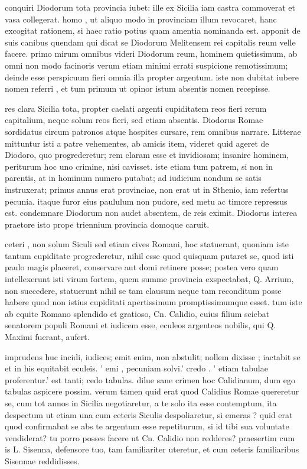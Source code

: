  conquiri Diodorum tota provincia iubet: ille ex Sicilia iam castra commoverat et vasa collegerat. homo , ut aliquo modo in provinciam illum revocaret, hanc excogitat rationem, si haec ratio potius quam amentia nominanda est. apponit de suis canibus quendam qui dicat se Diodorum Melitensem rei capitalis reum velle facere. primo mirum omnibus videri Diodorum reum, hominem quietissimum, ab omni non modo facinoris verum etiam minimi errati suspicione remotissimum; deinde esse perspicuum fieri omnia illa propter argentum. iste non dubitat iubere nomen referri , et tum primum ut opinor istum absentis nomen recepisse.

 res clara Sicilia tota, propter caelati argenti cupiditatem reos fieri rerum capitalium, neque solum reos fieri, sed etiam absentis. Diodorus Romae sordidatus circum patronos atque hospites cursare, rem omnibus narrare. Litterae mittuntur isti a patre vehementes, ab amicis item, videret quid ageret de Diodoro, quo progrederetur; rem claram esse et invidiosam; insanire hominem, periturum hoc uno crimine, nisi cavisset. iste etiam tum patrem, si non in parentis, at in hominum numero putabat; ad iudicium nondum se satis instruxerat; primus annus erat provinciae, non erat ut in Sthenio, iam refertus pecunia. itaque furor eius paululum non pudore, sed metu ac timore repressus est. condemnare Diodorum non audet absentem, de reis eximit. Diodorus interea praetore isto prope triennium provincia domoque caruit.

 ceteri , non solum Siculi sed etiam cives Romani, hoc statuerant, quoniam iste tantum cupiditate progrederetur, nihil esse quod quisquam putaret se, quod isti paulo magis placeret, conservare aut domi retinere posse; postea vero quam intellexerunt isti virum fortem, quem summe provincia exspectabat, Q. Arrium, non succedere, statuerunt nihil se tam clausum neque tam reconditum posse habere quod non istius cupiditati apertissimum promptissimumque esset. tum iste ab equite Romano splendido et gratioso, Cn. Calidio, cuius filium sciebat senatorem populi Romani et iudicem esse, eculeos argenteos nobilis, qui Q. Maximi fuerant, aufert.

 imprudens huc incidi, iudices; emit enim, non abstulit; nollem dixisse ; iactabit se et in his equitabit eculeis. ' emi , pecuniam solvi.' credo . ' etiam tabulae proferentur.' est tanti; cedo tabulas. dilue sane crimen hoc Calidianum, dum ego tabulas aspicere possim. verum tamen quid erat quod Calidius Romae quereretur se, cum tot annos in Sicilia negotiaretur, a te solo ita esse contemptum, ita despectum ut etiam una cum ceteris Siculis despoliaretur, si emeras ? quid erat quod confirmabat se abs te argentum esse repetiturum, si id tibi sua voluntate vendiderat? tu porro posses facere ut Cn. Calidio non redderes? praesertim cum is L. Sisenna, defensore tuo, tam familiariter uteretur, et cum ceteris familiaribus Sisennae reddidisses.

